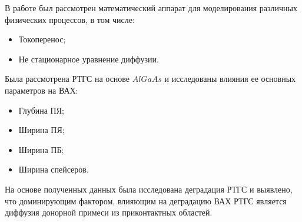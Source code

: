 \Conclusion
В работе был рассмотрен математический аппарат для моделирования различных физических процессов, в том числе:
\begin{itemize}
	\item Токоперенос;
	\item Не стационарное уравнение диффузии.
\end{itemize}

Была рассмотрена РТГС на основе $AlGaAs$ и исследованы влияния ее основных параметров на ВАХ:
\begin{itemize}
	\item Глубина ПЯ;
	\item Ширина ПЯ;
	\item Ширина ПБ;
	\item Ширина спейсеров.
\end{itemize}

На основе полученных данных была исследована деградация РТГС и выявлено, что доминирующим фактором, влияющим на деградацию ВАХ РТГС является диффузия донорной примеси из приконтактных областей.
